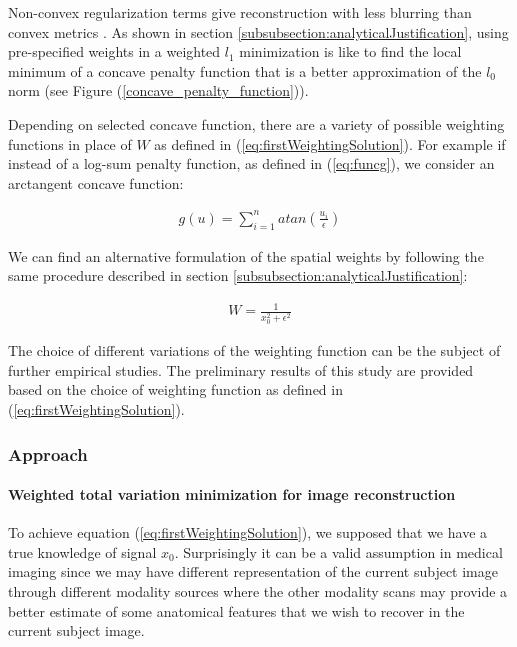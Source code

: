 Non-convex regularization terms give reconstruction with less blurring than convex metrics \cite{yang2013}. As shown in section \ref{subsubsection:analyticalJustification}, using pre-specified weights in a weighted $l_1$ minimization is like to find the local minimum of a concave penalty function that is a better approximation of the $l_0$ norm (see Figure (\ref{concave_penalty_function})).

Depending on selected concave function, there are a variety of possible weighting functions in place of $W$ as defined in (\ref{eq:firstWeightingSolution}). For example if instead of a log-sum penalty function, as defined in (\ref{eq:funcg}), we consider an arctangent concave function:

\begin{equation}
\label{eq:atan}
\begin{gathered}
g\left ( u \right ) =
\sum_{i=1}^{n} atan(\frac{u_{i}}{\epsilon })
\end{gathered}
\end{equation}

We can find an alternative formulation of the spatial weights by following the same procedure described in section \ref{subsubsection:analyticalJustification}:

\begin{equation}
\label{eq:newWeights}
\begin{gathered}
W = \frac{1}{ x_{0}^{2}+\epsilon^{2} }
\end{gathered}
\end{equation}

The choice of different variations of the weighting function can be the subject of further empirical studies. The preliminary results of this study are provided based on the choice of weighting function as defined in (\ref{eq:firstWeightingSolution}).
\newline

\subsubsection{Approach}

\paragraph{Weighted total variation minimization for image reconstruction}

To achieve equation (\ref{eq:firstWeightingSolution}), we supposed that we have a true knowledge of signal $x_{0}$. Surprisingly it can be a valid assumption in medical imaging since we may have different representation of the current subject image through different modality sources where the other modality scans may provide a better estimate of some anatomical features that we wish to recover in the current subject image.

